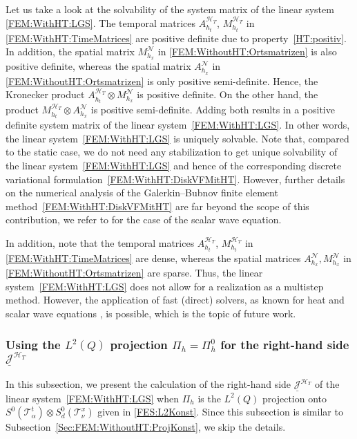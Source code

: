 \documentclass[a4paper,11pt]{article}
\renewcommand{\vec}[1]{\underline{#1}}
\begin{document}
Let us take a look at the solvability of the system matrix of the linear system \eqref{FEM:WithHT:LGS}. The temporal matrices $A_{h_t}^{\mathcal H_T}$, $M_{h_t}^{\mathcal H_T}$ in \eqref{FEM:WithHT:TimeMatrices} are positive definite due to property~\eqref{HT:positiv}. In addition, the spatial matrix $M_{h_x}^{\mathcal{N}}$ in \eqref{FEM:WithoutHT:Ortsmatrizen} is also positive definite, whereas the spatial matrix $A_{h_x}^{\mathcal{N}}$ in \eqref{FEM:WithoutHT:Ortsmatrizen} is only positive semi-definite. Hence, the Kronecker product $A_{h_t}^{\mathcal H_T} \otimes M_{h_x}^{\mathcal{N}}$ is positive definite. On the other hand, the product $ M_{h_t}^{\mathcal H_T} \otimes A_{h_x}^{\mathcal{N}}$ is positive semi-definite. Adding both results in a positive definite system matrix of the linear system~\eqref{FEM:WithHT:LGS}. In other words, the linear system~\eqref{FEM:WithHT:LGS} is uniquely solvable. Note that, compared to the static case, we do not need any stabilization to get unique solvability of the linear system~\eqref{FEM:WithHT:LGS} and hence of the corresponding discrete variational formulation~\eqref{FEM:WithHT:DiskVFMitHT}. However, further details on the numerical analysis of the Galerkin--Bubnov finite element method~\eqref{FEM:WithHT:DiskVFMitHT} are far beyond the scope of this contribution, we refer to \cite{LoescherSteinbachZankWelleTheorie, LoescherSteinbachZankDD} for the case of the scalar wave equation.

In addition, note that the temporal matrices $A_{h_t}^{\mathcal H_T}$, $M_{h_t}^{\mathcal H_T}$ in \eqref{FEM:WithHT:TimeMatrices} are dense, whereas the spatial matrices $A_{h_x}^{\mathcal{N}}, M_{h_x}^{\mathcal{N}}$ in \eqref{FEM:WithoutHT:Ortsmatrizen} are sparse. Thus, the linear system~\eqref{FEM:WithHT:LGS} does not allow for a realization as a multistep method. However, the application of fast (direct) solvers, as known for heat and scalar wave equations \cite{LangerZankSISC2021,ZankWelleLoeser,ZankWaermeLoeserICOSAHOM2022}, is possible, which is the topic of future work.


\subsubsection{Using the $L^2(Q)$ projection $\Pi_h = \Pi_h^0$ for the right-hand side $\vec{\mathcal J}^{\mathcal H_T}$} \label{Sec:FEM:WithHT:ProjKonst}

In this subsection, we present the calculation of the right-hand side $\vec{\mathcal J}^{\mathcal H_T}$ of the linear system~\eqref{FEM:WithHT:LGS} when $\Pi_h$ is the $L^2(Q)$ projection onto $S^0(\mathcal T^t_\alpha) \otimes S_d^0(\mathcal T^x_\nu)$ given in \eqref{FES:L2Konst}. Since this subsection is similar to Subsection~\ref{Sec:FEM:WithoutHT:ProjKonst}, we skip the details.
\end{document}
